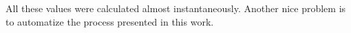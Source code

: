 All these values were calculated almost instantaneously.  Another nice problem is to automatize the process presented in this work.

\medskip\medskip

